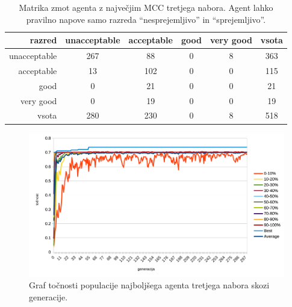 \begin{table}[H]
    \centering
    \caption{Matrika zmot agenta z največjim MCC tretjega nabora. Agent lahko pravilno napove samo razreda \enquote{nesprejemljivo} in \enquote{sprejemljivo}.}
    \begin{tabular}{||rccccc||}
        \hline
        razred       & unacceptable & acceptable & good & very good & vsota \\ \hline
        unacceptable & 267          & 88         & 0    & 8         & 363   \\ \hline
        acceptable   & 13            & 102        & 0    & 0         & 115   \\ \hline
        good         & 0            & 21         & 0    & 0         & 21    \\ \hline
        very good    & 0            & 19         & 0    & 0         & 19    \\ \hline
        vsota        & 280          & 230        & 0    & 8         & 518   \\ \hline
    \end{tabular}
    \label{tab:car_mcc_3}
\end{table}

\begin{figure}[H]
    \begin{center}
        \includegraphics[width=13cm]{car/3/acc}
    \end{center}
    \caption{Graf točnosti populacije najboljšega agenta tretjega nabora skozi generacije.}
    \label{fig:car_acc_3}
\end{figure}

